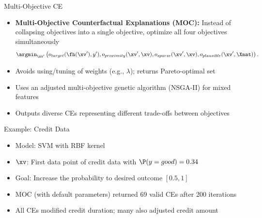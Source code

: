 \documentclass[11pt,compress,t,notes=noshow, aspectratio=169, xcolor=table]{beamer}
\begin{document}
\begin{frame}{Multi-Objective CE }
	\begin{itemize}
		\item \textbf{Multi-Objective Counterfactual Explanations (MOC):} Instead of collapsing objectives into a single objective, optimize all four objectives simultaneously
	$$	\argmin_{\xv'} \left(o_{target}(\fh(\xv'), y'), o_{proximity}(\xv', \xv), o_{sparse}(\xv', \xv), o_{plausible}(\xv', \Xmat) \right). $$
		
		\item Avoids using/tuning of weights (e.g., \(\lambda\)); returns Pareto-optimal set
		\item Uses an adjusted multi-objective genetic algorithm (NSGA-II) for mixed features %
		\item Outputs diverse CEs representing different trade-offs between objectives
	\end{itemize}

\end{frame}

\begin{frame}{Example: Credit Data}
	\begin{itemize}
		\item Model: SVM with RBF kernel
		\item $\xv$: First data point of credit data with $\P(y = good)  = 0.34$ %
		\item Goal: Increase the probability to desired outcome $[0.5, 1]$
		\item MOC (with default parameters) returned 69 valid CEs after 200 iterations%
		\item All CEs modified credit duration; many also adjusted credit amount
	\end{itemize}
\end{frame}
\end{document}
